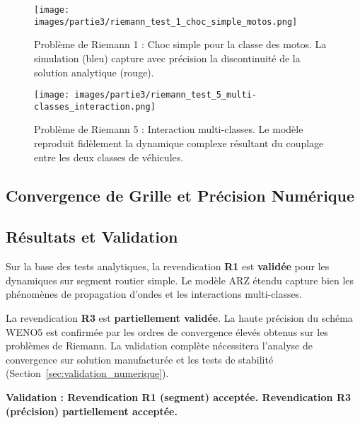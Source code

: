 \begin{figure}[htbp]
  \centering
  \texttt{[image: images/partie3/riemann\_test\_1\_choc\_simple\_motos.png]}
  \caption{Problème de Riemann 1 : Choc simple pour la classe des motos. La simulation (bleu) capture avec précision la discontinuité de la solution analytique (rouge).}
  \label{fig:riemann_choc_simple}
\end{figure}

\begin{figure}[htbp]
  \centering
  \texttt{[image: images/partie3/riemann\_test\_5\_multi-classes\_interaction.png]}
  \caption{Problème de Riemann 5 : Interaction multi-classes. Le modèle reproduit fidèlement la dynamique complexe résultant du couplage entre les deux classes de véhicules.}
  \label{fig:riemann_interaction_multiclasse}
\end{figure}


\subsection{Convergence de Grille et Précision Numérique}
\label{subsec:convergence_grille}

\subsection{Résultats et Validation}
\label{subsec:resultats_segment}

Sur la base des tests analytiques, la revendication \textbf{R1} est \textbf{validée} pour les dynamiques sur segment routier simple. Le modèle ARZ étendu capture bien les phénomènes de propagation d'ondes et les interactions multi-classes.

La revendication \textbf{R3} est \textbf{partiellement validée}. La haute précision du schéma WENO5 est confirmée par les ordres de convergence élevés obtenus sur les problèmes de Riemann. La validation complète nécessitera l'analyse de convergence sur solution manufacturée et les tests de stabilité (Section~\ref{sec:validation_numerique}).

\textbf{Validation : Revendication R1 (segment) acceptée. Revendication R3 (précision) partiellement acceptée.}

